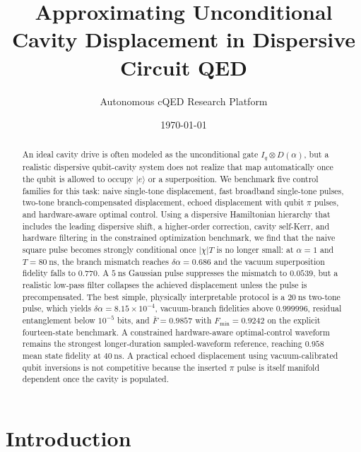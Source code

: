 \documentclass[aps,pra,twocolumn,reprint,floatfix,amsmath,amssymb]{revtex4-2}
\begin{document}
\title{Approximating Unconditional Cavity Displacement in Dispersive Circuit QED}
\author{Autonomous cQED Research Platform}
\date{\today}

\begin{abstract}
An ideal cavity drive is often modeled as the unconditional gate
\(
I_q \otimes D(\alpha)
\),
but a realistic dispersive qubit-cavity system does not realize that map automatically once the qubit is allowed to occupy \(|e\rangle\) or a superposition. We benchmark five control families for this task: naive single-tone displacement, fast broadband single-tone pulses, two-tone branch-compensated displacement, echoed displacement with qubit \(\pi\) pulses, and hardware-aware optimal control. Using a dispersive Hamiltonian hierarchy that includes the leading dispersive shift, a higher-order correction, cavity self-Kerr, and hardware filtering in the constrained optimization benchmark, we find that the naive square pulse becomes strongly conditional once \(|\chi|T\) is no longer small: at \(\alpha=1\) and \(T=\SI{80}{\nano\second}\), the branch mismatch reaches \(\delta\alpha=0.686\) and the vacuum superposition fidelity falls to \(0.770\). A \(\SI{5}{\nano\second}\) Gaussian pulse suppresses the mismatch to \(0.0539\), but a realistic low-pass filter collapses the achieved displacement unless the pulse is precompensated. The best simple, physically interpretable protocol is a \(\SI{20}{\nano\second}\) two-tone pulse, which yields \(\delta\alpha=8.15\times10^{-4}\), vacuum-branch fidelities above \(0.999996\), residual entanglement below \(10^{-5}\) bits, and \(\bar{F}=0.9857\) with \(F_{\min}=0.9242\) on the explicit fourteen-state benchmark. A constrained hardware-aware optimal-control waveform remains the strongest longer-duration sampled-waveform reference, reaching \(0.958\) mean state fidelity at \(\SI{40}{\nano\second}\). A practical echoed displacement using vacuum-calibrated qubit inversions is not competitive because the inserted \(\pi\) pulse is itself manifold dependent once the cavity is populated.
\end{abstract}

\maketitle

\section{Introduction}
\end{document}

